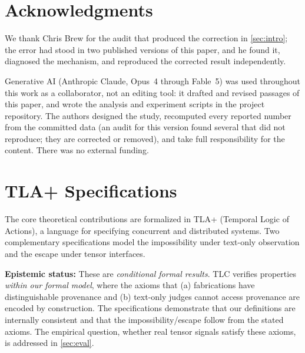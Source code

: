 \documentclass[11pt]{article}
\begin{document}
\section*{Acknowledgments}
We thank Chris Brew for the audit that produced the correction in
\autoref{sec:intro}; the error had stood in two published versions of this
paper, and he found it, diagnosed the mechanism, and reproduced the corrected
result independently.

Generative AI (Anthropic Claude, Opus~4 through Fable~5) was used throughout
this work as a collaborator, not an editing tool: it drafted and revised
passages of this paper, and wrote the analysis and experiment scripts in the
project repository. The authors designed the study, recomputed every reported
number from the committed data (an audit for this version found several that did
not reproduce; they are corrected or removed), and take full responsibility for
the content. There was no external
funding.




\appendix

\section{TLA+ Specifications}\label{app:tla}

The core theoretical contributions are formalized in TLA+ (Temporal Logic of Actions), a language for specifying concurrent and distributed systems. Two complementary specifications model the impossibility under text-only observation and the escape under tensor interfaces.

\textbf{Epistemic status:} These are \emph{conditional formal results}. TLC verifies properties \emph{within our formal model}, where the axioms that (a) fabrications have distinguishable provenance and (b) text-only judges cannot access provenance are encoded by construction. The specifications demonstrate that our definitions are internally consistent and that the impossibility/escape follow from the stated axioms. The empirical question, whether real tensor signals satisfy these axioms, is addressed in \autoref{sec:eval}.
\end{document}
